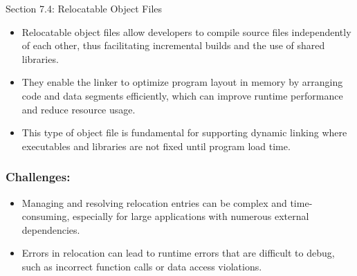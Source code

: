 \begin{notes}{Section 7.4: Relocatable Object Files}
    \begin{itemize}
        \item Relocatable object files allow developers to compile source files independently of each other, thus facilitating incremental builds and the use of shared libraries.
        \item They enable the linker to optimize program layout in memory by arranging code and data segments efficiently, which can improve runtime performance and reduce resource usage.
        \item This type of object file is fundamental for supporting dynamic linking where executables and libraries are not fixed until program load time.
    \end{itemize}
    
    \subsubsection*{Challenges:}
    
    \begin{itemize}
        \item Managing and resolving relocation entries can be complex and time-consuming, especially for large applications with numerous external dependencies.
        \item Errors in relocation can lead to runtime errors that are difficult to debug, such as incorrect function calls or data access violations.
    \end{itemize}    
\end{notes}